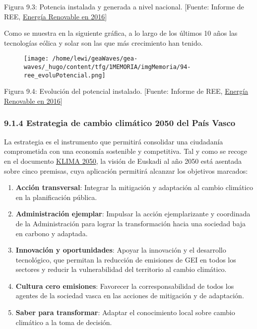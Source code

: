Figura 9.3: Potencia instalada y generada a nivel nacional. {[}Fuente:
Informe de REE,
\href{http://www.ree.es/es/estadisticas-del-sistema-electrico-espanol/informe-de-energias-renovables}{Energía
Renovable en 2016}{]}

Como se muestra en la siguiente gráfica, a lo largo de los últimos 10
años las tecnologías eólica y solar son las que más crecimiento han
tenido.

\begin{figure}
\centering
\texttt{[image: /home/lewi/geaWaves/gea-waves/\_hugo/content/tfg/1MEMORIA/imgMemoria/94-ree\_evoluPotencial.png]}
\caption{}
\end{figure}

Figura 9.4: Evolución del potencial instalado. {[}Fuente: Informe de
REE,
\href{http://www.ree.es/es/estadisticas-del-sistema-electrico-espanol/informe-de-energias-renovables}{Energía
Renovable en 2016}{]}

\subsubsection{9.1.4 Estrategia de cambio climático 2050 del País
Vasco}\label{header-n177}

La estrategia es el instrumento que permitirá consolidar una ciudadanía
comprometida con una economía sostenible y competitiva. Tal y como se
recoge en el documento
\href{http://www.euskadi.eus/contenidos/documentacion/klima2050/es_def/adjuntos/KLIMA2050_es.pdf}{KLIMA
2050}, la visión de Euskadi al año 2050 está asentada sobre cinco
premisas, cuya aplicación permitirá alcanzar los objetivos marcados:

\begin{enumerate}
\def\labelenumi{\arabic{enumi}.}
\item
  \textbf{Acción transversal}: Integrar la mitigación y adaptación al
  cambio climático en la planificación pública.
\item
  \textbf{Administración ejemplar}: Impulsar la acción ejemplarizante y
  coordinada de la Administración para lograr la transformación hacia
  una sociedad baja en carbono y adaptada.
\item
  \textbf{Innovación y oportunidades}: Apoyar la innovación y el
  desarrollo tecnológico, que permitan la reducción de emisiones de GEI
  en todos los sectores y reducir la vulnerabilidad del territorio al
  cambio climático.
\item
  \textbf{Cultura cero emisiones}: Favorecer la corresponsabilidad de
  todos los agentes de la sociedad vasca en las acciones de mitigación y
  de adaptación.
\item
  \textbf{Saber para transformar}: Adaptar el conocimiento local sobre
  cambio climático a la toma de decisión.
\end{enumerate}

